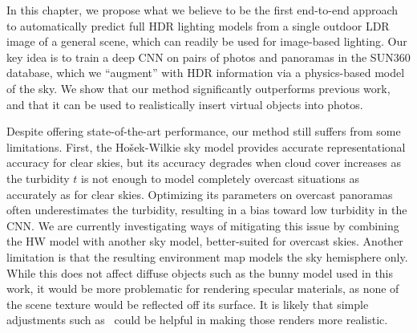 
In this chapter, we propose what we believe to be the first end-to-end approach to automatically predict full HDR lighting models from a single outdoor LDR image of a general scene, which can readily be used for image-based lighting. Our key idea is to train a deep CNN on pairs of photos and panoramas in the SUN360 database, which we ``augment'' with HDR information via a physics-based model of the sky. We show that our method significantly outperforms previous work, and that it can be used to realistically insert virtual objects into photos.

Despite offering state-of-the-art performance, our method still suffers from some limitations. First, the Ho\v{s}ek-Wilkie sky model provides accurate representational accuracy for clear skies, but its accuracy degrades when cloud cover increases as the turbidity $t$ is not enough to model completely overcast situations as accurately as for clear skies. Optimizing its parameters on overcast panoramas often underestimates the turbidity, resulting in a bias toward low turbidity in the CNN. We are currently investigating ways of mitigating this issue by combining the HW model with another sky model, better-suited for overcast skies. Another limitation is that the resulting environment map models the sky hemisphere only. While this does not affect diffuse objects such as the bunny model used in this work, it would be more problematic for rendering specular materials, as none of the scene texture would be reflected off its surface. It is likely that simple adjustments such as~\cite{khan-siggraph-06} could be helpful in making those renders more realistic. 

